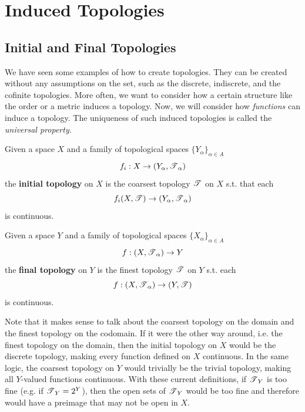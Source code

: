 \section{Induced Topologies} 

\subsection{Initial and Final Topologies} 

  We have seen some examples of how to create topologies. They can be created without any assumptions on the set, such as the discrete, indiscrete, and the cofinite topologies. More often, we want to consider how a certain structure like the order or a metric induces a topology. Now, we will consider how \textit{functions} can induce a topology. The uniqueness of such induced topologies is called the \textit{universal property}. 

  \begin{definition}
    Given a space $X$ and a family of topological spaces $\{Y_\alpha\}_{\alpha \in A}$ 
    \begin{equation}
      f_i : X \rightarrow (Y_\alpha, \T_\alpha)
    \end{equation} 
    the \textbf{initial topology} on $X$ is the coarsest topology $\T$ on $X$ s.t. that each 
    \begin{equation}
      f_i (X, \T) \rightarrow (Y_\alpha, \T_\alpha)
    \end{equation}
    is continuous. 
  \end{definition}

  \begin{definition}
    Given a space $Y$ and a family of topological spaces $\{X_\alpha\}_{\alpha \in A}$ 
    \begin{equation}
      f: (X, \T_\alpha) \rightarrow Y
    \end{equation}
    the \textbf{final topology} on $Y$ is the finest topology $\T$ on $Y$ s.t. each 
    \begin{equation}
      f: (X, \T_\alpha) \rightarrow (Y, \T)
    \end{equation}
    is continuous. 
  \end{definition}

  Note that it makes sense to talk about the coarsest topology on the domain and the finest topology on the codomain. If it were the other way around, i.e. the finest topology on the domain, then the initial topology on $X$ would be the discrete topology, making every function defined on $X$ continuous. In the same logic, the coarsest topology on $Y$ would trivially be the trivial topology, making all $Y$-valued functions continuous. With these current definitions, if $\T_Y$ is too fine (e.g. if $\T_Y = 2^Y$), then the open sets of $\T_Y$ would be too fine and therefore would have a preimage that may not be open in $X$. 

